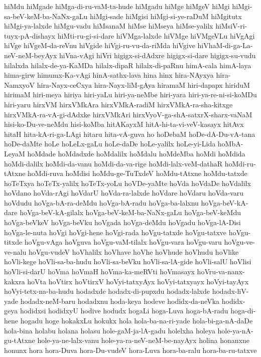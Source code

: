{hiMdu
hiMgade
hiMga-di-ru-vaM-ta-hude
hiMgadu
hiMge
hiMgeV
hiMgi
hiMgi-sa-beV-keM-ba-NaNx-gaLu
hiMgi-sade
hiMgisi
hiMgi-si-ye-raDuM
hiMgitutx
hiMgi-ya-lalxde
hiMgu-vadu
hiMsanaM
hiMse
hiMseya
hiMse-yalilx
hiMsiV-ri-tuyx-pA-dishayx
hiMti-ru-gi-si-dare
hiVMga-lalxde
hiVMge
hiVMgeVLu
hiVgAgi
hiVge
hiVgeM-da-reVnu
hiVgide
hiVgi-ru-vu-da-riMda
hiVgive
hiVhaM-di-ga-La-neV-neM-beyAyx
hiVna-vAgi
hiVri
higigx-si-dAdxre
higigx-si-dare
higigx-su-vudu
hilalxda
hilalx-de-ya-KaMDa
hilalx-dipaR
hilalx-di-paRnu
himA-cala
himA-laya
hima-girw
himumx-Ka-vAgi
hinA-sathx-lava
hina
hinx
hira-NAyxya
hira-NamxyoV
hira-Nayx-ceCxya
hira-Nayx-liM-gAya
hiramaM
hiri-dapapx
hiriduM
hirimaM
hiri-meya
hiriya
hiri-yaLu
hiri-ya-neMbe
hiri-yara
hiri-ya-re-ni-si-koMDu
hiri-yaru
hirxVM
hirxVMkAra
hirxVMkA-radiM
hirxVMkA-ra-sha-kitxge
hirxVMkA-ra-vA-gi-dAdxke
hirxVMkAri
hirxVyoV-ga-shA-satxrX-sharx-vaNaM
hisi-ko-Du-ve-neMdu
hisi-koMba
hitAKayxM
hitA-hi-ta-vi-veV-kasayx
hitAvx
hitaH
hita-kA-ri-ga-LAgi
hitaru
hita-vA-guva
ho
hoDebaM
hoDe-dA-Du-vA-tana
hoDe-daMte
hoLe
hoLeLx-gaLu
hoLe-daDe
hoLe-yalilx
hoLe-yi-Lida
hoMbA-LeyaM
hoMdade
hoMdadxde
hoMdalilx
hoMdalu
hoMdeMba
hoMdi
hoMdida
hoMdi-dalilx
hoMdi-da-vanu
hoMdi-da-va-rige
hoMdi-lalx-veM-dathaR
hoMdi-ru-tAtxne
hoMdi-ruva
hoMdisi
hoMdu-ge-TuTxdeV
hoMdu-tAtxne
hoMdu-tatxde
hoTeTxya
hoTeTx-yalilx
hoTeTx-yoLu
hoVDe-yaMte
hoVda
hoVdaDe
hoVdalilx
hoVdano
hoVda-rAgi
hoVdarU
hoVda-ra-lalxde
hoVdare
hoVdaru
hoVda-varu
hoVdudu
hoVga-bA-ra-deMdu
hoVga-bA-radu
hoVga-ba-lalxnu
hoVga-beV-kA-dare
hoVga-beV-kA-gilalx
hoVga-beV-keM-ba-NaNx-gaLu
hoVga-beV-keMdu
hoVga-beVkeV
hoVga-beVku
hoVgada
hoVga-deMdu
hoVgadu
hoVga-lA-Disi
hoVga-le-nuta
hoVgi
hoVgi-hene
hoVgi-rada
hoVgu-tatxde
hoVgu-tatxve
hoVgu-titxde
hoVgu-vAga
hoVguva
hoVgu-vaM-tilalx
hoVgu-vara
hoVgu-varu
hoVgu-ve-ve-nalu
hoVgu-vudeV
hoVhalilx
hoVhave
hoVhe
hoVhude
hoVhudu
hoVlike
hoVli-kege
hoVli-sa-ba-hudu
hoVli-sa-beVku
hoVli-sa-lA-gide
hoVli-salU
hoVlisi
hoVli-si-darU
hoVma
hoVmaH
hoVma-ka-meRVti
hoVmasayx
hoVru-va-nanx-kakxra
hoVta
hoVtirx
hoVtirxV
hoVyi-tatxyAyx
hoVyi-tatxyayx
hoVyi-tayAyx
hoVyi-tetx-na-ba-hudu
hodadxde
hodadx-di-pupxdu
hodadx-lalxde
hodadx-liV-yade
hodadx-neM-baru
hodadxnu
hoda-keya
hodeve
hodidx-da-neVka
hodidx-geya
hodidxsi
hodidxyU
hodive
hodudx
hogaLi
hoga-Luva
hoga-bA-radu
hoga-di-hene
hogadu
hoge
hokakxLu
hokukx
hola
hola-ba-na-ri-yade
hola-bi-ga-nA-daDe
hola-bina
holabu
holana
holasu
hole-gaM-ja-lA-gadu
holelxha
holeya
hole-ya-nA-gu-tAtxne
hole-ya-ne-lalx-vanu
hole-ya-ra-neV-neM-be-nayAyx
holina
honanxne
honunx
hora
hora-Duva
hora-Du-vudeV
hora-Luva
hora-ba-ralu
hora-ba-ru-tatxve
}
